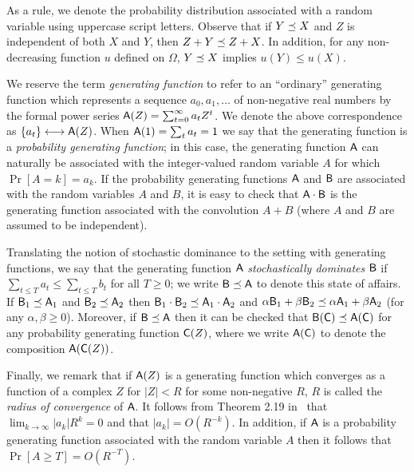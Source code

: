   As a rule, we denote the
  probability distribution associated with a random variable using
  uppercase script letters. 
  Observe that if $Y \preceq X$ and 
  $Z$ is independent of both $X$ and $Y$, 
  then $Z + Y \preceq Z + X$. 
  In addition, for any non-decreasing function $u$ defined on $\Omega$, 
  $Y \preceq X$ implies $u(Y) \leq u(X)$.

  We reserve the term
  \emph{generating function} to refer to an ``ordinary'' generating
  function which represents a sequence $a_0, a_1, \ldots$ of
  non-negative real numbers by the formal power series
  $\mathsf{A}(Z) = \sum_{t = 0}^\infty a_t Z^t$. 
  We denote the above correspondence as $\{a_t\} \longleftrightarrow \mathsf{A}(Z)$. 
  When
  $\mathsf{A}(1) = \sum_t a_t = 1$ we say that the generating function is
  a \emph{probability generating function}; in this case, the
  generating function $\mathsf{A}$ can naturally be associated with the
  integer-valued random variable $A$ for which $\Pr[A = k] = a_k$. If
  the probability generating functions $\mathsf{A}$ and $\mathsf{B}$ are
  associated with the random variables $A$ and $B$, it is easy to
  check that $\mathsf{A} \cdot \mathsf{B}$ is the generating function
  associated with the convolution $A + B$ (where $A$ and $B$ are
  assumed to be independent).  

  Translating the notion of stochastic
  dominance to the setting with generating functions, we say that the
  generating function $\mathsf{A}$ \emph{stochastically dominates}
  $\mathsf{B}$ if $\sum_{t \leq T} a_t \leq \sum_{t \leq T} b_t$ for all
  $T \geq 0$; we write $\mathsf{B} \preceq \mathsf{A}$ to denote this state of
  affairs. If $\mathsf{B}_1 \preceq \mathsf{A}_1$ and
  $\mathsf{B}_2 \preceq \mathsf{A}_2$ then
  $\mathsf{B}_1 \cdot \mathsf{B}_2 \preceq \mathsf{A}_1 \cdot \mathsf{A}_2$ and
  $\alpha \mathsf{B}_1 + \beta \mathsf{B}_2 \preceq \alpha \mathsf{A}_1 + \beta
  \mathsf{A}_2$ (for any $\alpha, \beta \geq 0$).  Moreover, if
  $\mathsf{B} \preceq \mathsf{A}$ then it can be checked that
  $\mathsf{B}(\mathsf{C}) \preceq \mathsf{A}(\mathsf{C})$ for any probability
  generating function $\mathsf{C}(Z)$, where we write $\mathsf{A}(\mathsf{C})$ to
  denote the composition $\mathsf{A}(\mathsf{C}(Z))$.


  Finally, we remark that
  if $\mathsf{A}(Z)$ is a generating function which converges as a
  function of a complex $Z$ for $|Z| < R$ for some non-negative $R$, 
  $R$ is called the \emph{radius of convergence} of $\mathsf{A}$.  
  It follows from Theorem 2.19 in~\cite{WilfGF} that 
  $\lim_{k \rightarrow \infty} {|a_k|}R^k = 0$ and that $|a_k| = O(R^{-k})$. 
  In addition, if $\mathsf{A}$ is a probability generating function associated with the
  random variable $A$ then it follows that
  $\Pr[A \geq T] = O(R^{-T})$.



